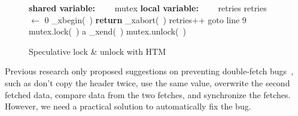 \documentclass[10pt]{llncs}
\begin{document}
\begin{figure}[htb!]
\begin{algorithmic}[1]
\State \textbf{shared variable:} 
\State ~~~~mutex
\State 
\State \textbf{local variable:} 
\State ~~~~retries
\State
{}
  \State retries $\gets$ 0
  \State \_xbegin(~) \label{line:xbegin}
  \State \textbf{return}
  \Else 
  \State \_xabort(~)
  \EndIf
  \State retries++
  \State goto line 9
  \Else
  \State mutex.lock(~) a
  \EndIf
\EndProcedure
\State
{}
\State \_xend(~)
\Else 
\State mutex.unlock(~)
\EndIf
\EndProcedure
\end{algorithmic}
\caption{Speculative lock \& unlock with HTM }
\label{speculative-lock}
\end{figure}




Previous research only proposed suggestions on preventing double-fetch bugs~\cite{wang, precise}, such as don't copy the header twice, use the same value, overwrite the second fetched data, compare data from the two fetches, and synchronize the fetches. However, we need a practical solution to automatically fix the bug.

\end{document}
